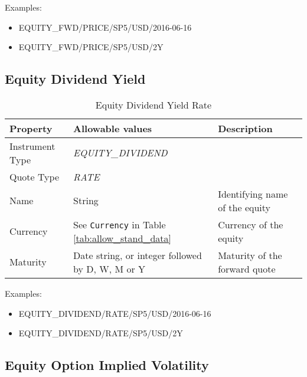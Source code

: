\medskip
Examples:
\begin{itemize}
    \item {EQUITY\_FWD/PRICE/SP5/USD/2016-06-16}
    \item {EQUITY\_FWD/PRICE/SP5/USD/2Y}
\end{itemize}

\subsection{Equity Dividend Yield}

\begin{table}[H]
    \centering
    \begin{tabular}{|p{3cm}|p{3.5cm}|p{7cm}|}
        \hline
        {\bf Property} & {\bf Allowable values} & {\bf Description} \\ \hline
        Instrument Type & \emph{EQUITY\_DIVIDEND} & \\ \hline
        Quote Type & \emph{RATE} & \\ \hline
        Name & String & Identifying name of the equity \\ \hline
        Currency & See \lstinline!Currency! in Table \ref{tab:allow_stand_data}&  Currency of the equity \\ \hline
        Maturity & Date string, or integer followed by D, W, M or Y & Maturity of the forward quote \\ \hline
    \end{tabular}
    \caption{Equity Dividend Yield Rate}
    \label{tab:eqdiv_quote}
\end{table}

\medskip
Examples:
\begin{itemize}
    \item {EQUITY\_DIVIDEND/RATE/SP5/USD/2016-06-16}
    \item {EQUITY\_DIVIDEND/RATE/SP5/USD/2Y}
\end{itemize}

\subsection{Equity Option Implied Volatility}
\label{md:equity_option_iv}

